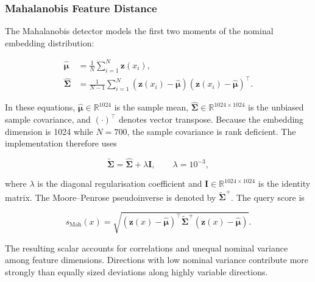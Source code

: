 \documentclass[fleqn,12pt]{olplainarticle}
\begin{document}
\subsubsection{Mahalanobis Feature Distance}
\label{subsubsec:mahalanobis}

The Mahalanobis detector models the first two moments of the nominal embedding
distribution:

\begin{align}
    \widehat{\boldsymbol{\mu}}
    &=
    \frac{1}{N}
    \sum_{i=1}^{N}
    \mathbf{z}(x_i),
    \label{eq:method_mahalanobis_mean}\\
    \widehat{\boldsymbol{\Sigma}}
    &=
    \frac{1}{N-1}
    \sum_{i=1}^{N}
    \left(
        \mathbf{z}(x_i)-\widehat{\boldsymbol{\mu}}
    \right)
    \left(
        \mathbf{z}(x_i)-\widehat{\boldsymbol{\mu}}
    \right)^{\top}.
    \label{eq:method_mahalanobis_covariance}
\end{align}

In these equations,
$\widehat{\boldsymbol{\mu}}\in\mathbb{R}^{1024}$ is the sample mean,
$\widehat{\boldsymbol{\Sigma}}\in\mathbb{R}^{1024\times1024}$ is the unbiased
sample covariance, and $(\cdot)^{\top}$ denotes vector transpose. Because the
embedding dimension is 1024 while $N=700$, the sample covariance is rank
deficient. The implementation therefore uses

\begin{equation}
    \widetilde{\boldsymbol{\Sigma}}
    =
    \widehat{\boldsymbol{\Sigma}}
    +
    \lambda\mathbf{I},
    \qquad
    \lambda=10^{-3},
    \label{eq:method_mahalanobis_regularisation}
\end{equation}

where $\lambda$ is the diagonal regularisation coefficient and
$\mathbf{I}\in\mathbb{R}^{1024\times1024}$ is the identity matrix. The
Moore--Penrose pseudoinverse is denoted by
$\widetilde{\boldsymbol{\Sigma}}^{+}$. The query score is

\begin{equation}
    s_{\mathrm{Mah}}(x)
    =
    \sqrt{
        \left(
            \mathbf{z}(x)-\widehat{\boldsymbol{\mu}}
        \right)^{\top}
        \widetilde{\boldsymbol{\Sigma}}^{+}
        \left(
            \mathbf{z}(x)-\widehat{\boldsymbol{\mu}}
        \right)
    }.
    \label{eq:method_mahalanobis_score}
\end{equation}

The resulting scalar accounts for correlations and unequal nominal variance
among feature dimensions. Directions with low nominal variance contribute
more strongly than equally sized deviations along highly variable
directions.
\end{document}
